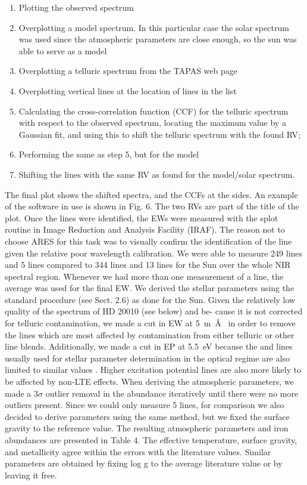 \begin{enumerate}
  \item Plotting the observed spectrum
  \item Overplotting a model spectrum. In this particular case the solar spectrum was used since the
        atmospheric parameters are close enough, so the sun was able to serve as a model
  \item Overplotting a telluric spectrum from the TAPAS web page \citep{Bertaux2014}
  \item Overplotting vertical lines at the location of lines in the list
  \item Calculating the cross-correlation function (CCF) for the telluric spectrum with respect to
        the observed spectrum, locating the maximum value by a Gaussian fit, and using this to shift
        the telluric spectrum with the found RV;
  \item Performing the same as step 5, but for the model
  \item Shifting the lines with the same RV as found for the model/solar spectrum.
\end{enumerate}

The final plot shows the shifted spectra, and the CCFs at the sides. An example of the software in
use is shown in Fig. 6. The two RVs are part of the title of the plot. Once the lines were
identified, the EWs were measured with the splot routine in Image Reduction and Analysis Facility
(IRAF). The reason not to choose ARES for this task was to visually confirm the identification of
the line given the relative poor wavelength calibration. We were able to measure 249 
lines and 5  lines compared to 344  lines and 13  lines for the
Sun over the whole NIR spectral region. Whenever we had more than one measurement of a line, the
average was used for the final EW. We derived the stellar parameters using the standard procedure
(see Sect. 2.6) as done for the Sun. Given the relatively low quality of the spectrum of HD 20010
(see below) and be- cause it is not corrected for telluric contamination, we made a cut in EW at
\SI{5}{m\AA{}} in order to remove the lines which are most affected by contamination from either
telluric or other line blends. Additionally, we made a cut in EP at \SI{5.5}{eV} because the
 and  lines usually used for stellar parameter determination in the optical
regime are also limited to similar values \citep[see e.g][]{Sousa2008a}. Higher excitation potential
lines are also more likely to be affected by non-LTE effects. When deriving the atmospheric
parameters, we made a $3\sigma$ outlier removal in the abundance iteratively until there were no
more outliers present. Since we could only measure 5  lines, for comparison we also
decided to derive parameters using the same method, but we fixed the surface gravity to the
reference value. The resulting atmospheric parameters and iron abundances are presented in Table 4.
The effective temperature, surface gravity, and metallicity agree within the errors with the
literature values. Similar parameters are obtained by fixing log g to the average literature value
or by leaving it free.

